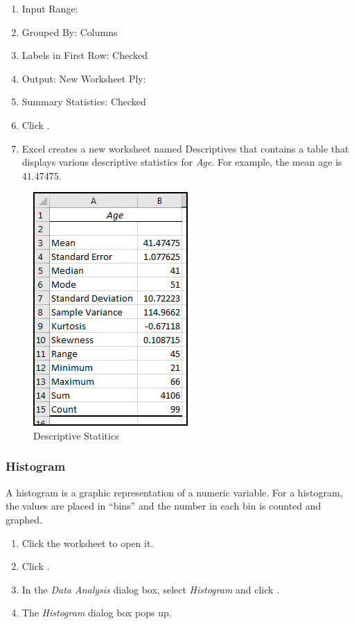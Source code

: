 \begin{enumerate}[resume]
	\item Input Range: 
	\item Grouped By: Columns
	\item Labels in First Row: Checked
	\item Output: New Worksheet Ply: 
	\item Summary Statistics: Checked
	\item Click .
	\item Excel creates a new worksheet named Descriptives that contains a table that displays various descriptive statistics for \textit{Age}. For example, the mean age is $ 41.47475 $.
\end{enumerate}

\begin{figure}[H]
	\centering
	\includegraphics[width=\maxwidth{.50\linewidth}]{gfx/ch09_fig61}
	\caption{Descriptive Statitics}
	\label{09:fig61}
\end{figure}

\subsubsection{Histogram}

A histogram is a graphic representation of a numeric variable. For a histogram, the values are placed in ``bins'' and the number in each bin is counted and graphed. 

\begin{enumerate}[resume]
	\item Click the  worksheet to open it.
	\item Click .
	\item In the \textit{Data Analysis} dialog box, select \textit{Histogram} and click .
	\item The \textit{Histogram} dialog box pops up.
\end{enumerate}


